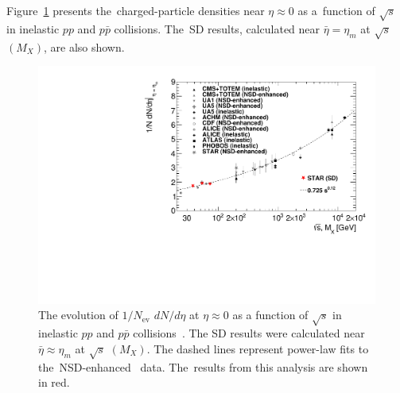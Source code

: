 Figure~\ref{fig:comparison_eta} presents the~charged-particle densities near $\eta\approx 0$ as a~function of $\sqrt{s}$ in inelastic $pp$ and $p\bar{p}$ collisions. The~SD results, calculated near $\bar{\eta}=\eta_{m}$ at $\sqrt{s}$ $(M_X)$, are also shown.  
\begin{figure}[b!]
	\centering
	\includegraphics[width=1\textwidth,page=1]{chapters/discussion/img/dNdeta_sqrts.pdf}
	\vspace{-0.3cm}
	\caption{The evolution of $1/N_\textrm{ev}$ $dN/d\eta$ at $\eta\approx 0$ as a function of $\sqrt{s}$ in inelastic $pp$ and $p\bar{p}$ collisions~\cite{CMS:intro_3,UA1:intro_1,UA5:comparison,ISR:comparison,CDF:intro_2,ALICE:comparison,ATLAS:charged100,ATLAS:intro_2,ATLAS:intro_1,STAR:spectra,PHOBOS:intro}. The SD results were calculated near $\bar{\eta}\approx\eta_{m}$  at $\sqrt{s}$ $(M_X)$. The dashed lines represent power-law fits to the~NSD-enhanced~\cite{CMS:intro_3} data.
		The~results from this analysis are shown in red. }
	\label{fig:comparison_eta}
\end{figure}

 



 

